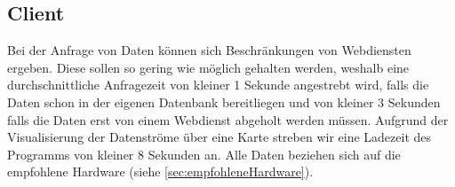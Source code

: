 \subsection{Client}
Bei der Anfrage von Daten können sich Beschränkungen von Webdiensten ergeben. Diese sollen so gering wie möglich gehalten werden, weshalb eine durchschnittliche Anfragezeit von kleiner 1 Sekunde angestrebt wird, falls die Daten schon in der eigenen Datenbank bereitliegen und von kleiner 3 Sekunden falls die Daten erst von einem Webdienst abgeholt werden müssen.
Aufgrund der Visualisierung der Datenströme über eine Karte streben wir eine Ladezeit des Programms von kleiner 8 Sekunden an.
Alle Daten beziehen sich auf die empfohlene Hardware (siehe \ref{sec:empfohleneHardware}).